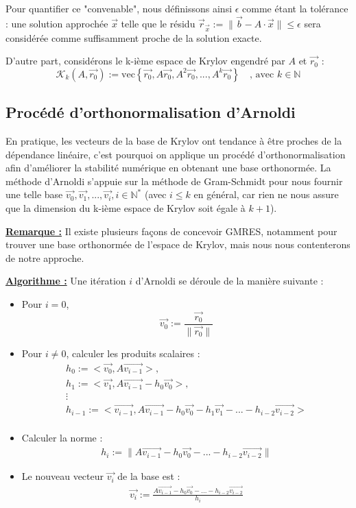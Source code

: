 \documentclass[11pt,a4paper,oneside]{memoir}
\newcommand{\N}{\mathbb{N}}	\newcommand{\Z}{\mathbb{Z}}
\theoremstyle{definition}
\theoremstyle{remark}
\theoremstyle{plain}
\begin{document}
Pour quantifier ce "convenable", nous définissons ainsi $\epsilon$ comme étant la tolérance : une solution approchée $\vec{x}$ telle que le résidu $ \vec{r}_{\vec{x}} := \lVert \vec{b} - A \cdot \vec{x} \rVert \leq \epsilon$ sera considérée comme suffisamment proche de la solution exacte.\medskip

D'autre part, considérons le k-ième espace de Krylov engendré par $A$ et $\vec{r_0}$ :
\[
\mathcal{K}_k (A,\vec{r_0}) := \text{vec}\left\{ \vec{r_0}, A\vec{r_0}, A^2 \vec{r_0}, ..., A^k \vec{r_0} \right\} \quad\text{, avec } k \in \N
\]

\subsection{Procédé d'orthonormalisation d'Arnoldi}

En pratique, les vecteurs de la base de Krylov ont tendance à être proches de la dépendance linéaire, c'est pourquoi on applique un procédé d'orthonormalisation afin d'améliorer la stabilité numérique en obtenant une base orthonormée. La méthode d'Arnoldi s'appuie sur la méthode de Gram-Schmidt pour nous fournir une telle base $\vec{v_0}, \vec{v_1}, ..., \vec{v_i}, i \in \N^*$ (avec $i \leq k$ en général, car rien ne nous assure que la dimension du k-ième espace de Krylov soit égale à $k+1$).\medskip

\underline{\textbf{Remarque :}} Il existe plusieurs façons de concevoir GMRES, notamment pour trouver une base orthonormée de l'espace de Krylov, mais nous nous contenterons de notre approche.\bigskip

\underline{\textbf{Algorithme :}}
Une itération $i$ d'Arnoldi se déroule de la manière suivante :
\begin{itemize}
\item Pour $i=0$,
\[
\vec{v_0} := \frac{\vec{r_0}}{\lVert \vec{r_0} \rVert}
\]
\item Pour $i \neq 0$, calculer les produits scalaires :
\[
\begin{array}{l}
h_0 := <\vec{v_0},A\vec{v_{i-1}}>, \\
h_1 := <\vec{v_1},A\vec{v_{i-1}} - h_0\vec{v_0}>, \\
\vdots \\
h_{i-1} := <\vec{v_{i-1}},A\vec{v_{i-1}} - h_0\vec{v_0} - h_1 \vec{v_1} - ... - h_{i-2} \vec{v_{i-2}}> \\
\end{array}
\]
\item Calculer la norme :
\[
\begin{array}{l}
h_i := \lVert A\vec{v_{i-1}} - h_0 \vec{v_0} - ... - h_{i-2} \vec{v_{i-2}} \rVert
\end{array}
\]
\item Le nouveau vecteur $\vec{v_i}$ de la base est :
\[
\begin{array}{l}
\vec{v_i} := \frac{A\vec{v_{i-1}} - h_0 \vec{v_0} - ... - h_{i-2} \vec{v_{i-2}}}{h_i}
\end{array}
\]
\end{itemize}
\end{document}
